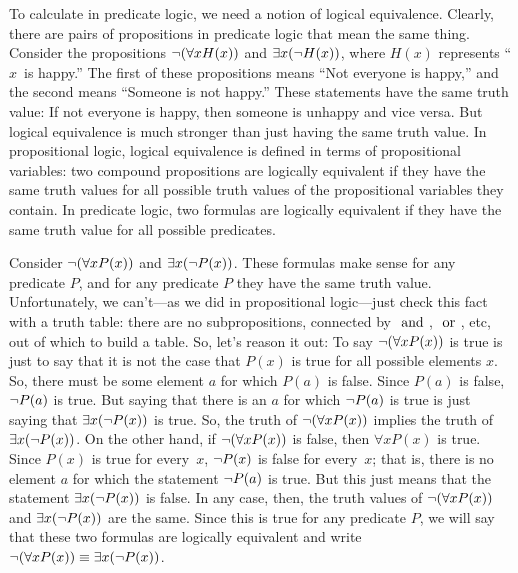 \medskip

To calculate in predicate logic, we need a notion of logical equivalence.
Clearly, there are pairs of propositions in predicate logic that mean the same
thing.  Consider the propositions $\lnot(\forall x H(x))$ and $\exists x(\lnot H(x))$, where
$H(x)$ represents ``$x$~is happy.'' The first of these propositions means
``Not everyone is happy,'' and the second means ``Someone is not happy.''
These statements have the same truth value:  If not everyone is happy, then someone is
unhappy and vice versa.  But logical equivalence is much stronger than just
having the same truth value.  In propositional logic, logical equivalence
is defined in terms of propositional variables:  two compound propositions
are logically equivalent if they have the same truth values for all possible
truth values of the propositional variables they contain.  In predicate logic, two
formulas are logically equivalent
if they have the same truth value for all
possible predicates.

Consider $\lnot(\forall x P(x))$ and $\exists x(\lnot P(x))$.
These formulas make
sense for any predicate $P$, and for any predicate $P$ they have the same truth
value.  Unfortunately, we can't---as we did in propositional logic---just check
this fact with a truth table: there are no subpropositions, connected by
$\text{ and }$, $\text{ or }$, etc, out of which to build a table.  So, let's reason it out:
To say $\lnot(\forall x P(x))$ is true is just to say that it is not the case that
$P(x)$ is true for all possible elements $x$.  So, there must be some element $a$
for which $P(a)$ is false.  Since $P(a)$ is false, $\lnot P(a)$ is true.
But saying that there is an $a$ for which $\lnot P(a)$ is true is just saying
that $\exists x(\lnot P(x))$ is true.  So, the truth of $\lnot(\forall x P(x))$
implies the truth of $\exists x (\lnot P(x))$.  On the other hand, if 
$\lnot(\forall x P(x))$ is false, then $\forall x P(x)$ is true.  Since $P(x)$
is true for every~$x$, $\lnot P(x)$ is false for every~$x$; that is, there is no
element $a$ for which the statement $\lnot P(a)$ is true.
But this just means that the statement $\exists x(\lnot P(x))$
is false.  In any case, then, the truth values of $\lnot(\forall x P(x))$ and
$\exists x(\lnot P(x))$ are the same.  Since this is true for any predicate $P$,
we will say that these two formulas are logically equivalent and write
$\lnot(\forall x P(x)) \equiv \exists x(\lnot P(x))$.

